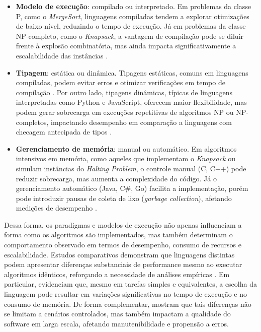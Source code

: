 \documentclass[12pt,a4paper]{article}
\newcommand{\eng}[1]{\textit{#1}}
\begin{document}
\begin{itemize}
  \item \textbf{Modelo de execução}: compilado ou interpretado. Em problemas da classe P, como o \eng{MergeSort}, linguagens compiladas tendem a explorar otimizações de baixo nível, reduzindo o tempo de execução. Já em problemas da classe NP-completo, como o \eng{Knapsack}, a vantagem de compilação pode se diluir frente à explosão combinatória, mas ainda impacta significativamente a escalabilidade das instâncias \cite{aho2007}.
  \item \textbf{Tipagem}: estática ou dinâmica. Tipagens estáticas, comuns em linguagens compiladas, podem evitar erros e otimizar verificações em tempo de compilação \cite{sebesta2016}. Por outro lado, tipagens dinâmicas, típicas de linguagens interpretadas como Python e JavaScript, oferecem maior flexibilidade, mas podem gerar sobrecarga em execuções repetitivas de algoritmos NP ou NP-completos, impactando desempenho em comparação a linguagens com checagem antecipada de tipos \cite{tanenbaum2015}.
  \item \textbf{Gerenciamento de memória}: manual ou automático. Em algoritmos intensivos em memória, como aqueles que implementam o \eng{Knapsack} ou simulam instâncias do \eng{Halting Problem}, o controle manual (C, C++) pode reduzir sobrecarga, mas aumenta a complexidade do código. Já o gerenciamento automático (Java, C\#, Go) facilita a implementação, porém pode introduzir pausas de coleta de lixo (\eng{garbage collection}), afetando medições de desempenho \cite{tanenbaum2015}.
\end{itemize}

Dessa forma, os paradigmas e modelos de execução não apenas influenciam a forma como os algoritmos são implementados, mas também determinam o comportamento observado em termos de desempenho, consumo de recursos e escalabilidade. Estudos comparativos demonstram que linguagens distintas podem apresentar diferenças substanciais de performance mesmo ao executar algoritmos idênticos, reforçando a necessidade de análises empíricas \cite{prechelt2000}. Em particular,  evidenciam que, mesmo em tarefas simples e equivalentes, a escolha da linguagem pode resultar em variações significativas no tempo de execução e no consumo de memória. De forma complementar,  mostram que tais diferenças não se limitam a cenários controlados, mas também impactam a qualidade do software em larga escala, afetando manutenibilidade e propensão a erros.
\end{document}
